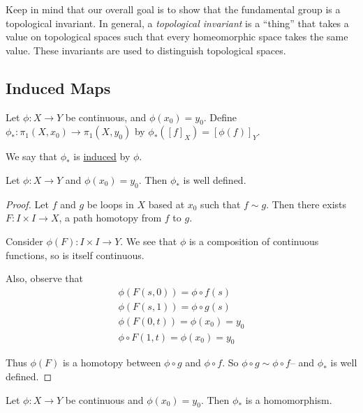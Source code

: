 Keep in mind that our overall goal is to show that the fundamental group is a topological invariant.  In general, a \emph{topological invariant} is a ``thing'' that takes a value on topological spaces such that every homeomorphic space takes the same value.  These invariants are used to distinguish topological spaces.

\subsection{Induced Maps}
\begin{definition}  Let $\phi:X\to Y$ be continuous, and $\phi(x_0)=y_0$.  Define $\phi_*: \pi_1(X,x_0)\to \pi_1(X,y_0)$ by $\phi_*([f]_X)=[\phi(f)]_Y.$

We say that $\phi_*$ is \underline{induced} by $\phi$.
\end{definition}

\begin{smallfact}  Let $\phi:X\to Y$ and $\phi(x_0)=y_0$.  Then $\phi_*$ is well defined.
\end{smallfact}

\begin{proof}
Let $f$ and $g$ be loops in $X$ based at $x_0$ such that $f\sim g$.  Then there exists $F:I\times I\to X$, a path homotopy from $f$ to $g$.  \vspace{.4in}

Consider $\phi(F): I\times I \to Y$.  We see that $\phi$ is a composition of continuous functions, so is itself continuous.  

Also, observe that  
\begin{align*}
 \phi(F(s,0))  =\phi\circ f(s)\\ 
 \phi(F(s,1)) =\phi\circ g(s)\\
 \phi(F(0,t))  =\phi(x_0) = y_0\\
 \phi\circ F(1,t) =\phi(x_0)=y_0
\end{align*}

Thus $\phi(F)$ is a homotopy between $\phi\circ g$ and $\phi\circ f$.  So $\phi\circ g\sim \phi\circ f$-- and $\phi_*$ is well defined.
\end{proof}

\begin{lemma} 
Let $\phi:X\to Y$ be continuous and $\phi(x_0)=y_0$.  Then $\phi_*$ is a homomorphism.
\end{lemma}

